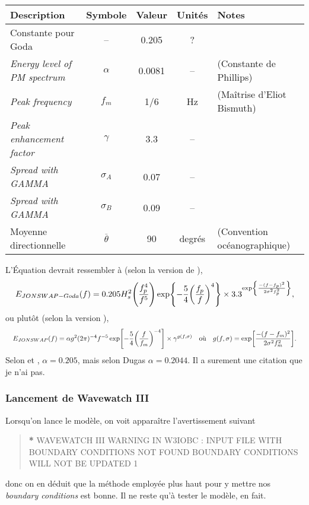 \documentclass[10pt]{article}
\numberwithin{equation}{section}
\begin{document}
\begin{center}
\begin{tabular}{lcccl}
\hline
\hline
Description & Symbole & Valeur & Unités & Notes\\
\hline
Constante pour Goda & -- & 0.205 & ? & \Textcite{goda1988variablity}\\
\emph{Energy level of PM spectrum} & \(\alpha\) & 0.0081 & -- & \Textcite{wwiii2016user} (Constante de Phillips)\\
\emph{Peak frequency} & \(f_m\) & 1/6 & Hz & (Maîtrise d'Eliot Bismuth)\\
\emph{Peak enhancement factor} & \(\gamma\) & 3.3 & -- & \Textcite{hasselmann1973measurements,wwiii2016user}\\
\emph{Spread with GAMMA} & \(\sigma_A\) & 0.07 & -- & \Textcite{hasselmann1973measurements,wwiii2016user}\\
\emph{Spread with GAMMA} & \(\sigma_B\) & 0.09 & -- & \Textcite{hasselmann1973measurements,wwiii2016user}\\
Moyenne directionnelle & \(\overline{\theta}\) & 90 & degrés & \Textcite{wwiii2016user} (Convention océanographique)\\
\hline
\end{tabular}
\end{center}

L'Équation devrait ressembler à (selon la version de \Textcite{goda1988variablity}),
\begin{equation}
   E_{JONSWAP-Goda}(f) = 0.205 H_s^2 \qty(\frac{f_p^4}{f^5}) \exp{-\frac{5}{4}\qty(\frac{f_p}{f})^4} \times 3.3^{\exp{\frac{-(f-f_p)^2}{2\sigma^2 f_p^2}}},
\end{equation}
ou plutôt (selon la version \Textcite{hasselmann1973measurements}), 
\begin{align}
   && E_{JONSWAP}(f) = \alpha g^2 (2\pi)^{-4} f^{-5} \exp[- \frac{5}{4} \qty(\frac{f}{f_m})^{-4}]\times \gamma^{g(f,\sigma)}
   && \text{où}
   && g(f,\sigma) = \exp[ \frac{-(f-f_m)^2}{2\sigma^2f_m^2}]. &&
\end{align}
Selon \Textcite{goda1988variablity} et \Textcite{hasselmann1973measurements}, \(\alpha = 0.205\), mais selon Dugas \(\alpha = 0.2044\). Il a surement une citation que je n'ai pas.
\subsubsection{Lancement de Wavewatch III}
\label{sec:org34fa489}

Lorsqu'on lance le modèle, on voit apparaître l'avertissement suivant
\begin{quote}
\textbf{*} WAVEWATCH III WARNING IN W3IOBC : 
    INPUT FILE WITH BOUNDARY CONDITIONS NOT FOUND
    BOUNDARY CONDITIONS WILL NOT BE UPDATED     1
\end{quote}
donc on en déduit que la méthode employée plus haut pour y mettre nos \emph{boundary conditions} est bonne. Il ne reste qu'à tester le modèle, en fait.


\printbibliography
\end{document}
